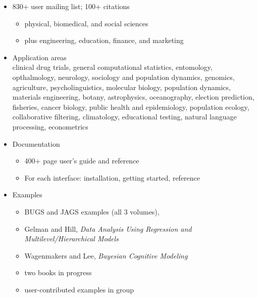 \documentclass[10pt]{report}
\newcommand{\sld}[1]{\newpage{\noindent\LARGE \ \ \
    \textcolor{MidnightBlue}{\bfseries #1}}\vspace*{4pt}}
\begin{document}
\sld{Who's Using Stan?}
\begin{itemize}
\item 830+ user mailing list; 100+ citations
\vspace*{-4pt}
\begin{itemize}\small
\item physical, biomedical, and social sciences
\item plus engineering, education, finance, and marketing
\end{itemize}
\item Application areas
  \\[3pt]
  {\footnotesize clinical drug trials, general computational
    statistics, entomology, opthalmology, neurology, sociology and
    population dynamics, genomics, agriculture, psycholinguistics,
    molecular biology, population dynamics, materials engineering,
    botany, astrophysics, oceanography, election prediction,
    fisheries, cancer biology, public health and epidemiology,
    population ecology, collaborative filtering, climatology,
    educational testing, natural language processing, econometrics}
\end{itemize}

\sld{Documentation and Examples}
%
\begin{itemize}
\item Documentation
\vspace*{-4pt}
\begin{itemize}\footnotesize
\item 400+ page user's guide and reference
\item For each interface: installation, getting started, reference
\end{itemize}
\item Examples
\vspace*{-4pt}
\begin{itemize}\footnotesize
\item BUGS and JAGS examples (all 3 volumes), 
\item Gelman and Hill, {\slshape Data Analysis Using Regression and \\
    Multilevel/Hierarchical Models}
\item Wagenmakers and Lee, {\slshape Bayesian Cognitive Modeling}
\item two books in progress
\item user-contributed examples in group
\end{itemize}
\end{itemize}
\end{document}

